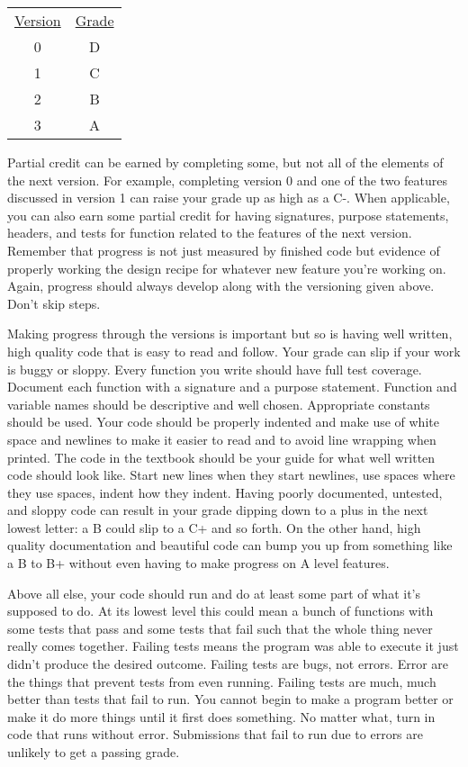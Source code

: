 \documentclass[10pt]{article}
\begin{document}
\begin{center}
\begin{tabular}{cc}
  \underline{Version} & \underline{Grade} \\
  0 & D \\
  1 & C \\
  2 & B \\
  3 & A \\
\end{tabular}
\end{center}


Partial credit can be earned by completing some, but not all of the elements of the next version. For example, completing version 0 and one of the two features discussed in version 1 can raise your grade up as high as a C-. When applicable, you can also earn some partial credit for having signatures, purpose statements, headers, and tests for function related to the features of the next version. Remember that progress is not just measured by finished code but evidence of properly working the design recipe for whatever new feature you're working on. Again, progress should always develop along with the versioning given above. Don't skip steps.

Making progress through the versions is important but so is having well written, high quality code that is easy to read and follow. Your grade can slip if your work is buggy or sloppy. Every function you write should have full test coverage. Document each function with a signature and a purpose statement. Function and variable names should be descriptive and well chosen. Appropriate constants should be used. Your code should be properly indented and make use of white space and newlines to make it easier to read and to avoid line wrapping when printed. The code in the textbook should be your guide for what well written code should look like. Start new lines when they start newlines, use spaces where they use spaces, indent how they indent. Having poorly documented, untested, and sloppy code can result in your grade dipping down to a plus in the next lowest letter: a B could slip to a C+ and so forth. On the other hand, high quality documentation and beautiful code can bump you up from something like a B to B+ without even having to make progress on A level features.

Above all else, your code should run and do at least some part of what it's supposed to do.  At its lowest level this could mean a bunch of functions with some tests that pass and some tests that fail such that the whole thing never really comes together. Failing tests means the program was able to execute it just didn't produce the desired outcome. Failing tests are bugs, not errors. Error are the things that prevent tests from even running. Failing tests are much, much better than tests that fail to run. You cannot begin to make a program better or make it do more things until it first does something. No matter what, turn in code that runs without error. Submissions that fail to run due to errors are unlikely to get a passing grade.
\end{document}
